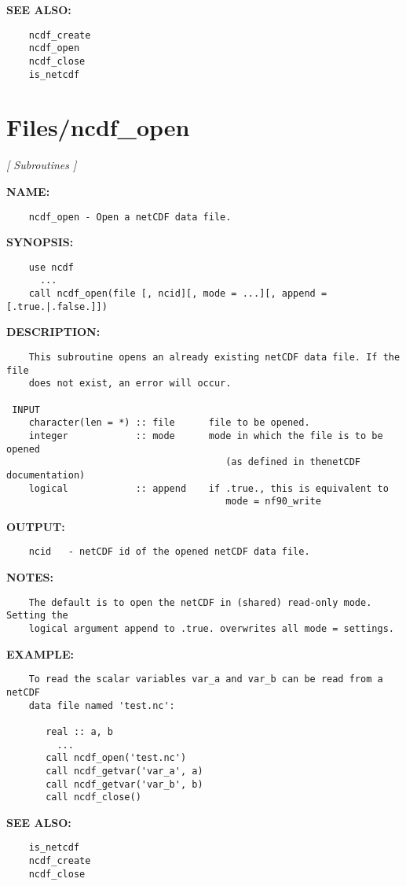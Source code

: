 \textbf{SEE ALSO:}\hspace{0.08in}\begin{Verbatim}
    ncdf_create
    ncdf_open
    ncdf_close
    is_netcdf
\end{Verbatim}
\section{Files/ncdf\_open}
\textsl{[ Subroutines ]}

\label{ch:robo62}
\label{ch:Files_ncdf_open}
\textbf{NAME:}\hspace{0.08in}\begin{Verbatim}
    ncdf_open - Open a netCDF data file.
\end{Verbatim}
\textbf{SYNOPSIS:}\hspace{0.08in}\begin{Verbatim}
    use ncdf
      ...
    call ncdf_open(file [, ncid][, mode = ...][, append = [.true.|.false.]])
\end{Verbatim}
\textbf{DESCRIPTION:}\hspace{0.08in}\begin{Verbatim}
    This subroutine opens an already existing netCDF data file. If the file
    does not exist, an error will occur.

 INPUT
    character(len = *) :: file      file to be opened.
    integer            :: mode      mode in which the file is to be opened
                                       (as defined in thenetCDF documentation)
    logical            :: append    if .true., this is equivalent to
                                       mode = nf90_write
\end{Verbatim}
\textbf{OUTPUT:}\hspace{0.08in}\begin{Verbatim}
    ncid   - netCDF id of the opened netCDF data file.
\end{Verbatim}
\textbf{NOTES:}\hspace{0.08in}\begin{Verbatim}
    The default is to open the netCDF in (shared) read-only mode. Setting the
    logical argument append to .true. overwrites all mode = settings.
\end{Verbatim}
\textbf{EXAMPLE:}\hspace{0.08in}\begin{Verbatim}
    To read the scalar variables var_a and var_b can be read from a netCDF
    data file named 'test.nc':

       real :: a, b
         ...
       call ncdf_open('test.nc')
       call ncdf_getvar('var_a', a)
       call ncdf_getvar('var_b', b)
       call ncdf_close()
\end{Verbatim}
\textbf{SEE ALSO:}\hspace{0.08in}\begin{Verbatim}
    is_netcdf
    ncdf_create
    ncdf_close
\end{Verbatim}
